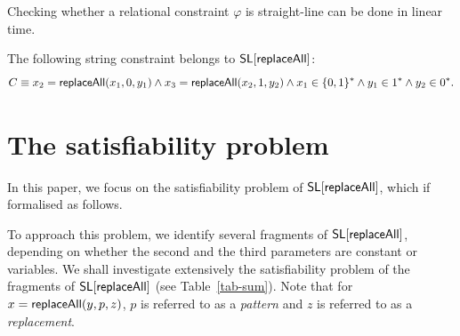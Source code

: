 \begin{remark}
Checking whether a relational constraint $\varphi$ is straight-line can be done in linear time. 
\end{remark}


\begin{example}
The following string constraint belongs to $\mathsf{SL}[\mathsf{replaceAll}]$: 
$$C \equiv x_2 = \mathsf{replaceAll}(x_1, 0, y_1) \wedge x_3 = \mathsf{replaceAll}(x_2, 1, y_2) \wedge x_1 \in \{0,1\}^* \wedge y_1 \in 1^* \wedge y_2 \in 0^*.$$
\end{example}




\section{The satisfiability problem} \label{sec-sat}
In this paper, we focus on the satisfiability problem of $\mathsf{SL}[\mathsf{replaceAll}]$, which if formalised as follows. 

\smallskip

\begin{quote}
\end{quote}
\smallskip

To approach this problem, we identify several fragments of  $\mathsf{SL}[\mathsf{replaceAll}]$, depending on whether the second and the third parameters are constant or variables.  We shall investigate extensively the satisfiability problem of the fragments of $\mathsf{SL}[\mathsf{replaceAll}]$ (see Table~\ref{tab-sum}).  Note that for $x=\mathsf{replaceAll} (y, p, z)$, $p$ is referred to as a \emph{pattern} and $z$ is referred to as a \emph{replacement}.



